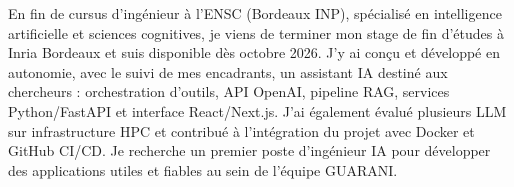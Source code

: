 
\begin{cvparagraph}
En fin de cursus d’ingénieur à l’ENSC (Bordeaux INP), spécialisé en intelligence artificielle et sciences cognitives, je viens de terminer mon stage de fin d’études à Inria Bordeaux et suis disponible dès octobre 2026. J’y ai conçu et développé en autonomie, avec le suivi de mes encadrants, un assistant IA destiné aux chercheurs : orchestration d’outils, API OpenAI, pipeline RAG, services Python/FastAPI et interface React/Next.js. J’ai également évalué plusieurs LLM sur infrastructure HPC et contribué à l’intégration du projet avec Docker et GitHub CI/CD. Je recherche un premier poste d’ingénieur IA pour développer des applications utiles et fiables au sein de l’équipe GUARANI.
\end{cvparagraph}
